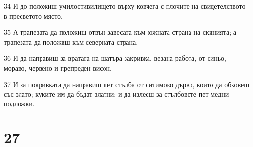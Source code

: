 \par 34 И до положиш умилостивилището върху ковчега с плочите на свидетелството в пресветото място.
\par 35 А трапезата да положиш отвън завесата към южната страна на скинията; а трапезата да положиш към северната страна.
\par 36 И да направиш за вратата на шатъра закривка, везана работа, от синьо, мораво, червено и препреден висон.
\par 37 И за покривката да направиш пет стълба от ситимово дърво, които да обковеш със злато; куките им да бъдат златни; и да излееш за стълбовете пет медни подложки.

\chapter{27}

